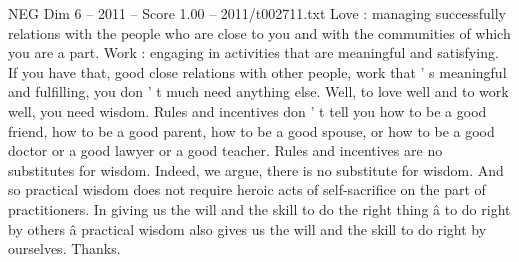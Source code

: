 \begin{textsample}{NEG Dim 6 – 2011 – Score 1.00 – 2011/t002711.txt}
Love : managing successfully relations with the people who are close to you and with the communities of which you are a part.
Work : engaging in activities that are meaningful and satisfying.
If you have that, good close relations with other people, work that ' s meaningful and fulfilling, you don ' t much need anything else.
Well, to love well and to work well, you need wisdom.
Rules and incentives don ' t tell you how to be a good friend, how to be a good parent, how to be a good spouse, or how to be a good doctor or a good lawyer or a good teacher.
Rules and incentives are no substitutes for wisdom.
Indeed, we argue, there is no substitute for wisdom.
And so practical wisdom does not require heroic acts of self-sacrifice on the part of practitioners.
In giving us the will and the skill to do the right thing â to do right by others â practical wisdom also gives us the will and the skill to do right by ourselves.
Thanks.

\end{textsample}
